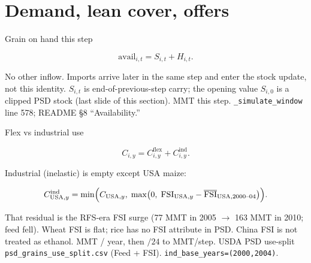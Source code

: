 \section{Demand, lean cover, offers}

\begin{frame}{Grain on hand this step}

\[
\mathrm{avail}_{i,t}=S_{i,t}+H_{i,t}.
\]

No other inflow. Imports arrive later in the same step and enter the
stock update, not this identity. $S_{i,t}$ is end-of-previous-step carry;
the opening value $S_{i,0}$ is a clipped PSD stock (last slide of this
section).
{MMT this step.}
{\texttt{\_simulate\_window} line 578; README \S8 ``Availability.''}
\end{frame}

\begin{frame}{Flex vs industrial use}

\[
C_{i,y} = C^{\mathrm{flex}}_{i,y} + C^{\mathrm{ind}}_{i,y}.
\]

Industrial (inelastic) is empty except USA maize:

\[
C^{\mathrm{ind}}_{\mathrm{USA},y}
= \min\Bigl(C_{\mathrm{USA},y},\;
\max\bigl(0,\; \mathrm{FSI}_{\mathrm{USA},y}
- \overline{\mathrm{FSI}}_{\mathrm{USA},2000\text{--}04}\bigr)\Bigr).
\]

That residual is the RFS-era FSI surge (77 MMT in 2005 $\to$ 163 MMT in
2010; feed fell). Wheat FSI is flat; rice has no FSI attribute in PSD.
China FSI is not treated as ethanol.
{MMT / year, then $/24$ to MMT/step.}
{USDA PSD use-split \texttt{psd\_grains\_use\_split.csv} (Feed + FSI).
\texttt{ind\_base\_years=(2000,2004)}.}
\end{frame}

